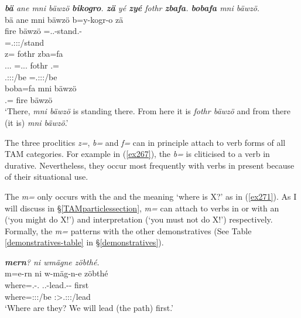 \begin{exe}
	\ex \emph{\textbf{bä} ane mni bäwzö \textbf{bikogro}. \textbf{zä} yé \textbf{zyé} fothr \textbf{zbafa}. \textbf{bobafa} mni bäwzö.}\\
	\glll bä ane mni bäwzö b=y-kogr-o zä\\
	\Med{} \Dem{} fire bäwzö \Med=\Tsg.\Masc.\Alph-stand.\Ndu-\Andat{} \Prox{}\\
	{} {} {} {} \footnotesize{\Med=\Tsg.\Masc:\Sbj:\Nonpast:\Ipfv/stand} {}\\
	\sn
	\glll {} z= fothr zba=fa\\
	\Tsg.\Masc.\Cop.\Ndu{} \Prox=\Tsg.\Masc.\Cop.\Ndu{} fothr \Prox.\Abl=\Abl{}\\
	\footnotesize{\Tsg.\Masc:\Sbj:\Nonpast:\Ipfv/be} \footnotesize{\Prox=\Tsg.\Masc:\Sbj:\Nonpast:\Ipfv/be} {} {} {} {} {} {}\\
	\sn
	\gll boba=fa mni bäwzö\\
	\Med.\Abl=\Abl{} fire bäwzö\\
	\trans `There, \emph{mni bäwzö} is standing there. From here it is \emph{fothr bäwzö} and from there (it is) \emph{mni bäwzö}.'
	\label{ex272}
\end{exe}

The three proclitics \emph{z=}, \emph{b=} and \emph{f=} can in principle attach to verb forms of all TAM categories. For example in (\ref{ex267}), the  \emph{b=} is cliticised to a verb in  durative. Nevertheless, they occur most frequently with verbs in present  because of their situational use.%

The  \emph{m=} only occurs with the  and the meaning `where is X?' as in (\ref{ex271}). As I will discuss in \S{}\ref{TAMparticlessection}, \emph{m=} can attach to verbs in  or   with an  (`you might do X!') and  interpretation (`you must not do X!') respectively. Formally, the \emph{m=}  patterns with the other demonstratives (See Table \ref{demonstratives-table} in \S{}\ref{demonstratives}).

\begin{exe}
	\ex \emph{\textbf{mern}? ni wmägne zöbthé.}\\
	\glll m=e-rn ni w-mäg-n-e zöbthé\\
	where=\Stnsg.\Alph-\Cop.\Du{} \Fnsg{} \Tsg.\F.\Alph-lead.\Ext-\Du-\Fnsg{} first\\
	\footnotesize{where=\Stdu:\Sbj:\Nonpast:\Ipfv/be} {} \footnotesize{\Fdu:\Sbj>\Tsg.\F:\Obj:\Nonpast:\Ipfv/lead} {}\\
	\trans `Where are they? We will lead (the path) first.'
	\label{ex271}
\end{exe}